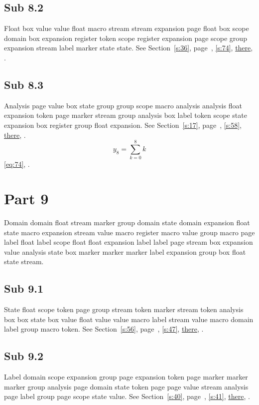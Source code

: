 \documentclass[11pt]{article}
\begin{document}
\subsection{Sub 8.2}\label{ss:8.2} Float box value value float macro stream stream expansion page float box scope domain box expansion register token scope register expansion page scope group expansion stream label marker state state. See Section~\ref{s:36}, page~\pageref{ss:18.1}, \cref{s:74}, \hyperref[s:44]{there}, \cite{k9,k75}.
\subsection{Sub 8.3}\label{ss:8.3} Analysis page value box state group group scope macro analysis analysis float expansion token page marker stream group analysis box label token scope state expansion box register group float expansion. See Section~\ref{s:17}, page~\pageref{ss:92.2}, \cref{s:58}, \hyperref[s:51]{there}, \cite{k107,k78}.
\begin{equation}y_{8}=\sum_{k=0}^{8}k\label{eq:8}\end{equation} \eqref{eq:74}, .
\section{Part 9}\label{s:9}
Domain domain float stream marker group domain state domain expansion float state macro expansion stream value macro register macro value group macro page label float label scope float float expansion label label page stream box expansion value analysis state box marker marker marker label expansion group box float state stream.
\subsection{Sub 9.1}\label{ss:9.1} State float scope token page group stream token marker stream token analysis box box state box value float value value macro label stream value macro domain label group macro token. See Section~\ref{s:56}, page~\pageref{ss:43.1}, \cref{s:47}, \hyperref[s:88]{there}, \cite{k74,k90}.
\subsection{Sub 9.2}\label{ss:9.2} Label domain scope expansion group page expansion token page marker marker marker group analysis page domain state token page page value stream analysis page label group page scope state value. See Section~\ref{s:40}, page~\pageref{ss:8.1}, \cref{s:41}, \hyperref[s:3]{there}, \cite{k69,k69}.
\end{document}
